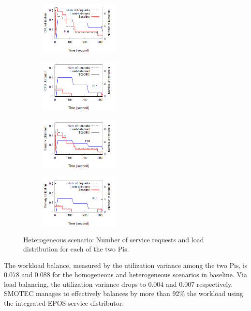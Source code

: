 \documentclass[conference]{IEEEtran}
\begin{document}
\begin{figure}[!htb]
    \centering
    \begin{subfigure}{\linewidth}
        \centering
        \includegraphics[clip, width=4cm, trim=0.0cm 1.3cm 0cm 0cm]{figures/cpu-edge0.png}
    \end{subfigure}
    \begin{subfigure}{\linewidth}
        \centering
        \includegraphics[clip, trim=0.0cm 1.3cm 0cm 0cm, width=4cm]{figures/cpu-edge1.png}
    \end{subfigure}	
    \centering
    \begin{subfigure}{\linewidth}
        \centering
        \includegraphics[clip, width=4cm]{figures/mem-edge0.png}
    \end{subfigure}
    \begin{subfigure}{\linewidth}
        \centering
         \includegraphics[clip, width=4cm]{figures/mem-edge1.png}
    \end{subfigure}
    \caption{Heterogeneous scenario: Number of service requests and load distribution for each of the two Pis.}
    \label{fig:hetLoad}
\end{figure}

\par The workload balance, measured by the utilization variance among the two Pis, is 0.078 and 0.088 for the homogeneous and heterogeneous scenarios in baseline. Via load balancing, the utilization variance drops to 0.004 and 0.007 respectively. SMOTEC manages to effectively balances by more than 92\% the workload using the integrated EPOS service distributor. 
\end{document}
